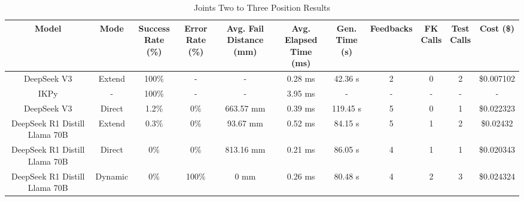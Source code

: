 \begin{landscape}
\begin{table}[H]
\tiny
\renewcommand{\arraystretch}{1.2}
\caption{Joints Two to Three Position Results}
\begin{center}
\begin{tabular}{|c|c|c|c|c|c|c|c|c|c|c|}
    \hline
    \textbf{Model} & 
    \textbf{Mode} & 
    \makecell{\textbf{Success}\\\textbf{Rate (\%)}} &
    \makecell{\textbf{Error}\\\textbf{Rate (\%)}} &
    \makecell{\textbf{Avg. Fail}\\\textbf{Distance (mm)}} &
    \makecell{\textbf{Avg. Elapsed}\\\textbf{Time (ms)}} &
    \makecell{\textbf{Gen.}\\\textbf{Time (s)}} &
    \textbf{Feedbacks} &
    \makecell{\textbf{FK}\\\textbf{Calls}} &
    \makecell{\textbf{Test}\\\textbf{Calls}} &
    \textbf{Cost (\$)} \\
    \hline
    DeepSeek V3 & Extend & 100\% & - & - & 0.28 ms & 42.36 s & 2 & 0 & 2 & \$0.007102 \\
    \hline
    IKPy & - & 100\% & - & - & 3.95 ms & - & - & - & - & - \\
    \hline
    DeepSeek V3 & Direct & 1.2\% & 0\% & 663.57 mm & 0.39 ms & 119.45 s & 5 & 0 & 1 & \$0.022323 \\
    \hline
    DeepSeek R1 Distill Llama 70B & Extend & 0.3\% & 0\% & 93.67 mm & 0.52 ms & 84.15 s & 5 & 1 & 2 & \$0.02432 \\
    \hline
    DeepSeek R1 Distill Llama 70B & Direct & 0\% & 0\% & 813.16 mm & 0.21 ms & 86.05 s & 4 & 1 & 1 & \$0.020343 \\
    \hline
    DeepSeek R1 Distill Llama 70B & Dynamic & 0\% & 100\% & 0 mm & 0.26 ms & 80.48 s & 4 & 2 & 3 & \$0.024324 \\
    \hline
\end{tabular}
\label{Results-Position-2-3}
\end{center}
\end{table}


\end{landscape}
